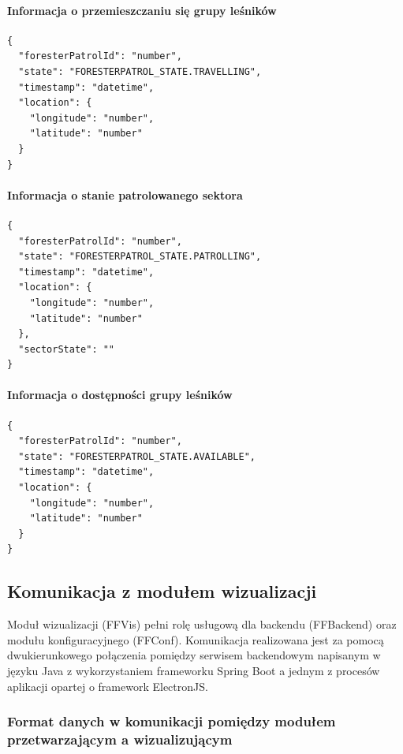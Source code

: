 \paragraph{Informacja o przemieszczaniu się grupy leśników}

\begin{verbatim}
{
  "foresterPatrolId": "number",
  "state": "FORESTERPATROL_STATE.TRAVELLING",
  "timestamp": "datetime",
  "location": {
    "longitude": "number",
    "latitude": "number"
  }
}
\end{verbatim}

\paragraph{Informacja o stanie patrolowanego sektora}

\begin{verbatim}
{
  "foresterPatrolId": "number",
  "state": "FORESTERPATROL_STATE.PATROLLING",
  "timestamp": "datetime",
  "location": {
    "longitude": "number",
    "latitude": "number"
  },
  "sectorState": ""
}
\end{verbatim}

\paragraph{Informacja o dostępności grupy leśników}

\begin{verbatim}
{
  "foresterPatrolId": "number",
  "state": "FORESTERPATROL_STATE.AVAILABLE",
  "timestamp": "datetime",
  "location": {
    "longitude": "number",
    "latitude": "number"
  }
}
\end{verbatim}

\subsection{Komunikacja z modułem wizualizacji}

Moduł wizualizacji (FFVis) pełni rolę usługową dla backendu (FFBackend) oraz modułu konfiguracyjnego (FFConf). Komunikacja realizowana jest za pomocą dwukierunkowego połączenia pomiędzy serwisem backendowym napisanym w języku Java z wykorzystaniem frameworku Spring Boot a jednym z procesów aplikacji opartej o framework ElectronJS.

\subsubsection{Format danych w komunikacji pomiędzy modułem przetwarzającym a wizualizującym}

